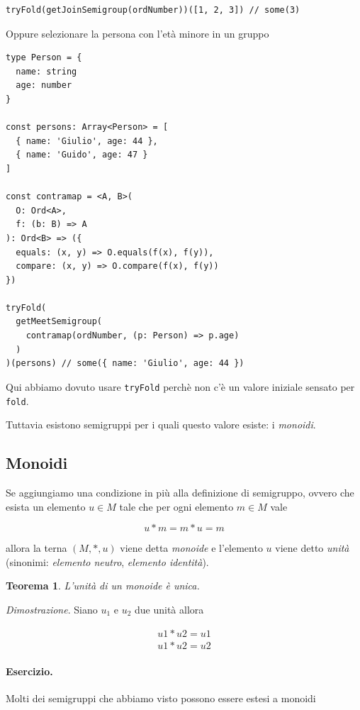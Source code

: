 \documentclass[12pt]{article}
\newtheorem{theorem}{Teorema}
\begin{document}
\begin{verbatim}
tryFold(getJoinSemigroup(ordNumber))([1, 2, 3]) // some(3)
\end{verbatim}

Oppure selezionare la persona con l'età minore in un gruppo

\begin{verbatim}
type Person = {
  name: string
  age: number
}

const persons: Array<Person> = [
  { name: 'Giulio', age: 44 },
  { name: 'Guido', age: 47 }
]

const contramap = <A, B>(
  O: Ord<A>,
  f: (b: B) => A
): Ord<B> => ({
  equals: (x, y) => O.equals(f(x), f(y)),
  compare: (x, y) => O.compare(f(x), f(y))
})

tryFold(
  getMeetSemigroup(
    contramap(ordNumber, (p: Person) => p.age)
  )
)(persons) // some({ name: 'Giulio', age: 44 })
\end{verbatim}

Qui abbiamo dovuto usare \texttt{tryFold} perchè non c'è un valore iniziale sensato per \texttt{fold}.

Tuttavia esistono semigruppi per i quali questo valore esiste: i \emph{monoidi}.

\subsection{Monoidi}

Se aggiungiamo una condizione in più alla definizione di semigruppo, ovvero che esista un elemento $u \in M$
tale che per ogni elemento $m \in M$ vale

$$
u * m = m * u = m
$$

allora la terna $(M, *, u)$ viene detta \emph{monoide} e l'elemento $u$ viene detto \emph{unità}
(sinonimi: \emph{elemento neutro}, \emph{elemento identità}).

\begin{theorem}
L'unità di un monoide è unica.
\end{theorem}

\emph{Dimostrazione}. Siano $u_1$ e $u_2$ due unità allora

\begin{eqnarray}
u1 * u2 = u1 \\
u1 * u2 = u2
\end{eqnarray}

\paragraph{Esercizio.} Molti dei semigruppi che abbiamo visto possono essere estesi a monoidi
\end{document}
